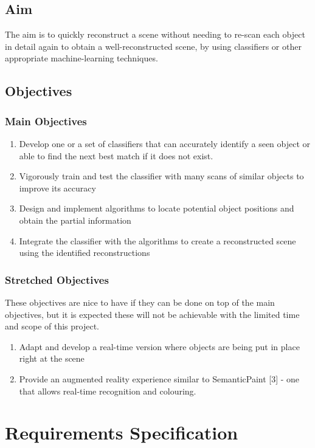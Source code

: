 \documentclass[11pt,openright,a4paper]{report}
\begin{document}
\section{Aim}
The aim is to quickly reconstruct a scene without needing to re-scan each object in detail again to obtain a well-reconstructed scene, by using classifiers or other appropriate machine-learning techniques.

\section{Objectives}
\subsection{Main Objectives}
\begin{enumerate}
  \item Develop one or a set of classifiers that can accurately identify a seen object or able to find the next best match if it does not exist.
  \item Vigorously train and test the classifier with many scans of similar objects to improve its accuracy
  \item Design and implement algorithms to locate potential object positions and obtain the partial information
  \item Integrate the classifier with the algorithms to create a reconstructed scene using the identified reconstructions
\end{enumerate}

\subsection{Stretched Objectives}
These objectives are nice to have if they can be done on top of the main objectives, but it is expected these will not be achievable with the limited time and scope of this project.
\begin{enumerate}
  \item Adapt and develop a real-time version where objects are being put in place right at the scene
  \item Provide an augmented reality experience similar to SemanticPaint [3] - one that allows real-time recognition and colouring.
\end{enumerate}

\newpage

\chapter{Requirements Specification}
\end{document}
